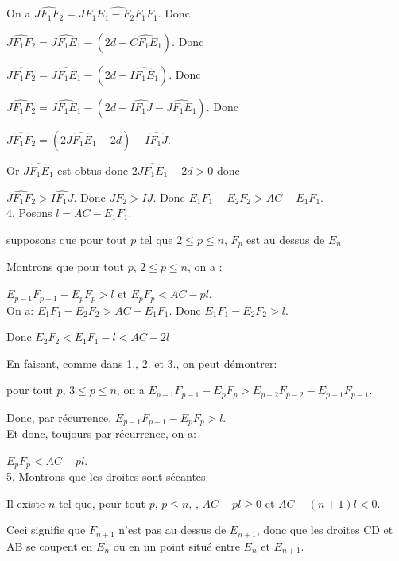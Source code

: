 \documentclass[a4paper, 12pt, twoside]{book}
\begin{document}
 On a $\hat{JF_{1}F_{2}}=\hat{JF_{1}E_{1}-F_{2}F_{1}F_{1}}$. Donc\
 
  $\hat{JF_{1}F_{2}}=\hat{JF_{1}E_{1}}-(2d-\hat{CF_{1}E_{1}})$. Donc\
  
   $\hat{JF_{1}F_{2}}=\hat{JF_{1}E_{1}}-(2d-\hat{IF_{1}E_{1} })$. Donc\
   
    $\hat{JF_{1}F_{2}}=\hat{JF_{1}E_{1}}-(2d-\hat{IF_{1}J}-\hat{JF_{1}E_{1}}) $. Donc\
    
   $\hat{JF_{1}F_{2}}=(2\hat{JF_{1}E_{1}}-2d)+\hat{IF_{1}J} $. \
   
   Or $\hat{JF_{1}E_{1}}$ est obtus donc  $2\hat{JF_{1}E_{1}}-2d>0$ donc\
   
  $ \hat{JF_{1}F_{2}}>\hat{IF_{1}J}$. Donc $JF_{2}>IJ$. Donc
  $E_{1}F_{1}-E_{2}F_{2}>AC-E_{1}F_{1}$.\\
  
 4. Posons $l=AC-E_{1}F_{1}$.\
 
 supposons que  pour tout $p$ tel que $2\leq p\leq n$, $F_{p}$ est au dessus de $E_{n}$
 
  Montrons que pour tout $p$, $2\leq p\leq n$,  on a :\
  
   $E_{p-1}F_{p-1}-E_{p}F_{p}>l$ et $E_{p}F_{p}<AC-pl$.\\
  
  
  On a:  $E_{1}F_{1}-E_{2}F_{2}>AC-E_{1}F_{1}$. Donc 
  $E_{1}F_{1}-E_{2}F_{2}>l$. \
  
  Donc $E_{2}F_{2}<E_{1}F_{1}-l<AC-2l$\
  
  En faisant, comme dans 1., 2. et 3., on peut démontrer:\
  
  pour tout $p$, $3\leq p\leq n$, on a $E_{p-1}F_{p-1}-E_{p}F_{p}>E_{p-2}F_{p-2}-E_{p-1}F_{p-1}$.\
  
  Donc, par récurrence, $E_{p-1}F_{p-1}-E_{p}F_{p}>l$.\\
  
  Et donc, toujours par récurrence, on a:\
  
  $E_{p}F_{p}<AC-pl$.\\
  
  5. Montrons que les droites sont sécantes.\
  
  Il existe $n$ tel que, pour tout $p$, $p\leq n$, 
, $AC-pl\geq0$ et $AC-(n+1)l<0$.\

Ceci signifie que $F_{n+1}$ n'est pas au dessus de $E_{n+1}$, donc que les droites CD et AB se coupent en $E_{n}$ ou en un point situé entre $E_{n}$ et $E_{n+1}$. \\
\end{document}
